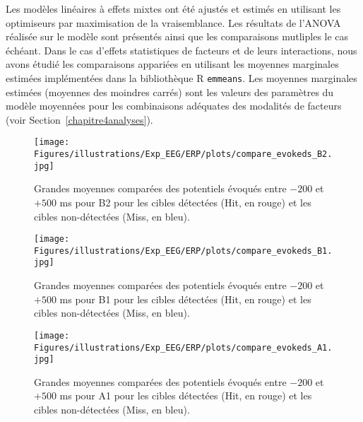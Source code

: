 Les modèles linéaires à effets mixtes ont été ajustés et estimés en utilisant les optimiseurs par maximisation de la vraisemblance. 
Les résultats de l'ANOVA réalisée sur le modèle sont présentés ainsi que les comparaisons mutliples le cas échéant. 
Dans le cas d'effets statistiques de facteurs et de leurs interactions, nous avons étudié les comparaisons appariées en utilisant les moyennes marginales estimées implémentées dans la bibliothèque R \texttt{emmeans}.
Les moyennes marginales estimées (moyennes des moindres carrés) sont les valeurs des paramètres du modèle moyennées pour les combinaisons adéquates des modalités de facteurs (voir Section~\ref{chapitre4analyses}). 

\begin{landscape}
\begin{figure*}[!t]
\centering
\texttt{[image: Figures/illustrations/Exp\_EEG/ERP/plots/compare\_evokeds\_B2.jpg]}
\caption[Grandes moyennes comparées des ERPs (-200:+500) ms pour B2]{Grandes moyennes comparées des potentiels évoqués entre $-200$ et $+500$ ms pour B2 pour les cibles détectées (Hit, en rouge) et les cibles non-détectées (Miss, en bleu).}
\label{fig:figure5compareevokedsB2}
\end{figure*}
\end{landscape}

\begin{landscape}
\begin{figure*}[!t]
\centering
\texttt{[image: Figures/illustrations/Exp\_EEG/ERP/plots/compare\_evokeds\_B1.jpg]}
\caption[Grandes moyennes comparées des ERPs (-200:+500) ms pour B1]{Grandes moyennes comparées des potentiels évoqués entre $-200$ et $+500$ ms pour B1 pour les cibles détectées (Hit, en rouge) et les cibles non-détectées (Miss, en bleu).}
\label{fig:figure5compareevokedsB1}
\end{figure*}
\end{landscape}

\begin{landscape}
\begin{figure*}[!t]
\centering
\texttt{[image: Figures/illustrations/Exp\_EEG/ERP/plots/compare\_evokeds\_A1.jpg]}
\caption[Grandes moyennes comparées des ERP (-200:+500) ms pour A1]{Grandes moyennes comparées des potentiels évoqués entre $-200$ et $+500$ ms pour A1 pour les cibles détectées (Hit, en rouge) et les cibles non-détectées (Miss, en bleu).}
\label{fig:figure5compareevokedsA1}
\end{figure*}
\end{landscape}

